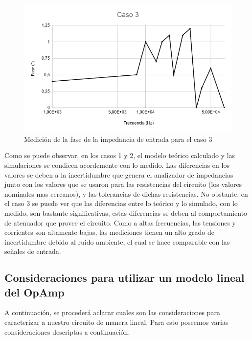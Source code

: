 \begin{figure}[H]
\begin{centering}
\includegraphics[scale=0.5]{../Ex1/iA/Resources1a/zinpp3_med}
\par\end{centering}
\caption{Medición de la fase de la impedancia de entrada para el caso 3}

\end{figure}

Como se puede observar, en los casos 1 y 2, el modelo teórico calculado
y las simulaciones se condicen acordemente con lo medido. Las diferencias
en los valores se deben a la incertidumbre que genera el analizador
de impedancias junto con los valores que se usaron para las resistencias
del circuito (los valores nominales mas cercanos), y las tolerancias
de dichas resistencias. No obstante, en el caso 3 se puede ver que
las diferencias entre lo teórico y lo simulado, con lo medido, son
bastante significativas, estas diferencias se deben al comportamiento
de atenuador que provee el circuito. Como a altas frecuencias, las
tensiones y corrientes son altamente bajas, las mediciones tienen
un alto grado de incertidumbre debido al ruido ambiente, el cual se
hace comparable con las señales de entrada.

\subsection{Consideraciones para utilizar un modelo lineal del OpAmp}

A continuación, se procederá aclarar cuales son las consideraciones
para caracterizar a nuestro circuito de manera lineal. Para esto poseemos
varias consideraciones descriptas a continuación.

